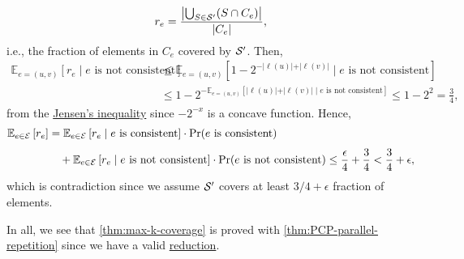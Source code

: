 \begin{enumerate}[(a)]
\begin{explanation}
		      \[
			      r_e = \frac{\left\vert \bigcup_{S\in \mathcal{\MakeUppercase{s}} ^\prime } (S \cap C_e) \right\vert}{\vert C_e \vert},
		      \]
		      i.e., the fraction of elements in \(C_e\) covered by \(\mathcal{\MakeUppercase{S}} ^\prime \). Then,
		      \[
			      \begin{split}
				      \mathbb{E}_{e=(u, v)}\left[r_e \mid e \text{ is not consistent} \right]
				      &\leq \mathbb{E}_{e=(u, v)}\left[1 - 2^{-\vert \ell (u) \vert + \vert \ell (v) \vert } \mid e \text{ is not consistent} \right]\\
				      &\leq 1 - 2^{-\mathbb{E}_{e=(u, v)}\left[\vert \ell (u) \vert + \vert \ell (v) \vert \mid e \text{ is not consistent} \right]}
				      \leq 1 - 2^{2} = \frac{3}{4},
			      \end{split}
		      \]
		      from the \href{https://en.wikipedia.org/wiki/Jensen's_inequality}{Jensen's inequality} since \(-2^{-x}\) is a concave function. Hence,
		      \[
			      \begin{split}
				      \mathbb{E}_{e\in \mathcal{\MakeUppercase{e}} }\left[r_e \right]
				      &= \mathbb{E}_{e\in \mathcal{\MakeUppercase{e}} }\left[ r_e \mid e\text{ is consistent} \right] \cdot \Pr_{}(e\text{ is consistent}) \\
				      &\quad + \mathbb{E}_{e\in \mathcal{\MakeUppercase{e}} }\left[ r_e \mid e\text{ is not consistent} \right] \cdot \Pr_{}(e\text{ is not consistent})
				      \leq \frac{\epsilon}{4} + \frac{3}{4} < \frac{3}{4} + \epsilon,
			      \end{split}
		      \]
		      which is contradiction since we assume \(\mathcal{\MakeUppercase{s}} ^\prime \) covers at least \(3 / 4 + \epsilon \) fraction of elements.
	      \end{explanation}
\end{enumerate}

In all, we see that \autoref{thm:max-k-coverage} is proved with \autoref{thm:PCP-parallel-repetition} since we have a valid \hyperref[def:reduction]{reduction}.